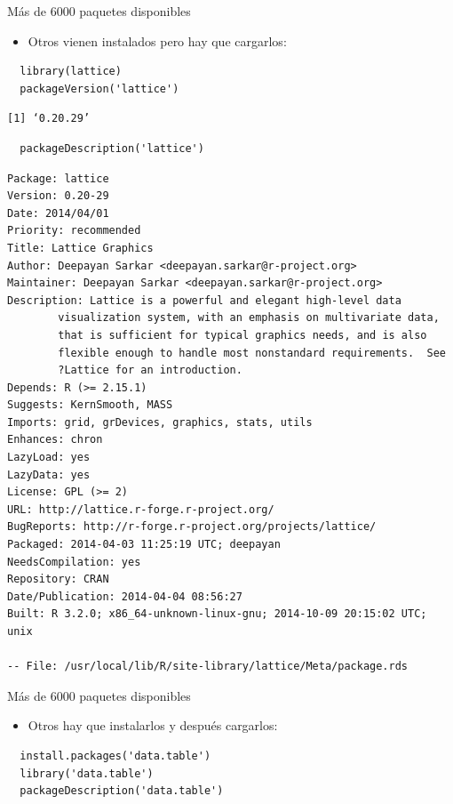 \documentclass[xcolor={usenames,svgnames,dvipsnames}]{beamer}
\begin{document}
\begin{frame}[fragile,label=sec-1-3-4]{Más de 6000 paquetes disponibles}
 \begin{itemize}
\item Otros vienen instalados pero hay que cargarlos:
\end{itemize}
\lstset{language=R,label= ,caption= ,numbers=none}
\begin{lstlisting}
  library(lattice)
  packageVersion('lattice')
\end{lstlisting}

\begin{verbatim}
[1] ‘0.20.29’
\end{verbatim}

\lstset{language=R,label= ,caption= ,numbers=none}
\begin{lstlisting}
  packageDescription('lattice')
\end{lstlisting}

\begin{verbatim}
Package: lattice
Version: 0.20-29
Date: 2014/04/01
Priority: recommended
Title: Lattice Graphics
Author: Deepayan Sarkar <deepayan.sarkar@r-project.org>
Maintainer: Deepayan Sarkar <deepayan.sarkar@r-project.org>
Description: Lattice is a powerful and elegant high-level data
        visualization system, with an emphasis on multivariate data,
        that is sufficient for typical graphics needs, and is also
        flexible enough to handle most nonstandard requirements.  See
        ?Lattice for an introduction.
Depends: R (>= 2.15.1)
Suggests: KernSmooth, MASS
Imports: grid, grDevices, graphics, stats, utils
Enhances: chron
LazyLoad: yes
LazyData: yes
License: GPL (>= 2)
URL: http://lattice.r-forge.r-project.org/
BugReports: http://r-forge.r-project.org/projects/lattice/
Packaged: 2014-04-03 11:25:19 UTC; deepayan
NeedsCompilation: yes
Repository: CRAN
Date/Publication: 2014-04-04 08:56:27
Built: R 3.2.0; x86_64-unknown-linux-gnu; 2014-10-09 20:15:02 UTC; unix

-- File: /usr/local/lib/R/site-library/lattice/Meta/package.rds
\end{verbatim}
\end{frame}

\begin{frame}[fragile,label=sec-1-3-5]{Más de 6000 paquetes disponibles}
 \begin{itemize}
\item Otros hay que instalarlos y después cargarlos:
\end{itemize}
\lstset{language=R,label= ,caption= ,numbers=none}
\begin{lstlisting}
  install.packages('data.table')
  library('data.table')
  packageDescription('data.table')
\end{lstlisting}
\end{frame}
\end{document}

